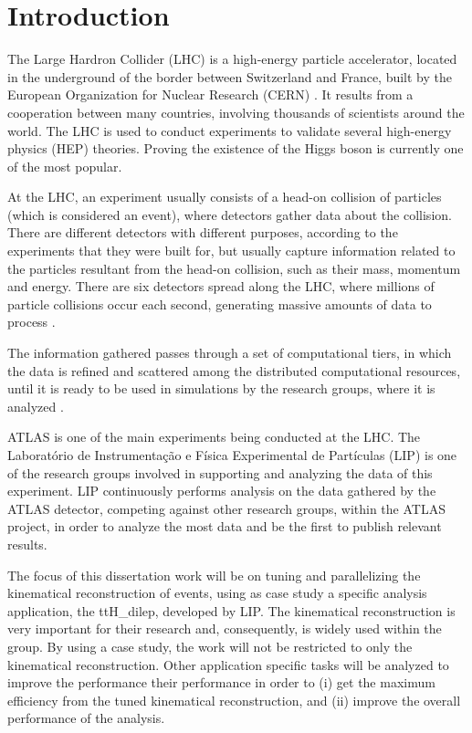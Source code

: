 
\chapter{Introduction}

The Large Hardron Collider (LHC) \cite{CERN:LHC} is a high-energy particle accelerator, located in the underground of the border between Switzerland and France, built by the European Organization for Nuclear Research (CERN) \cite{CERN}. It results from a cooperation between many countries, involving thousands of scientists around the world. The LHC is used to conduct experiments to validate several high-energy physics (HEP) theories. Proving the existence of the Higgs boson is currently one of the most popular.

At the LHC, an experiment usually consists of a head-on collision of particles (which is considered an event), where detectors gather data about the collision. There are different detectors with different purposes, according to the experiments that they were built for, but usually capture information related to the particles resultant from the head-on collision, such as their mass, momentum and energy. There are six detectors spread along the LHC, where millions of particle collisions occur each second, generating massive amounts of data to process \cite{LIP:Ibergrid}.

The information gathered passes through a set of computational tiers, in which the data is refined and scattered among the distributed computational resources, until it is ready to be used in simulations by the research groups, where it is analyzed \cite{CERN:DATA}.

ATLAS \cite{CERN:ATLAS} is one of the main experiments being conducted at the LHC. The Laboratório de Instrumentação e Física Experimental de Partículas (LIP) \cite{LIP} is one of the research groups involved in supporting and analyzing the data of this experiment. LIP continuously performs analysis on the data gathered by the ATLAS detector, competing against other research groups, within the ATLAS project, in order to analyze the most data and be the first to publish relevant results.

The focus of this dissertation work will be on tuning and parallelizing the kinematical reconstruction of events, using as case study a specific analysis application, the ttH\_dilep, developed by LIP. The kinematical reconstruction is very important for their research and, consequently, is widely used within the group. By using a case study, the work will not be restricted to only the kinematical reconstruction. Other application specific tasks will be analyzed to improve the performance their performance in order to (i) get the maximum efficiency from the tuned kinematical reconstruction, and (ii) improve the overall performance of the analysis.

